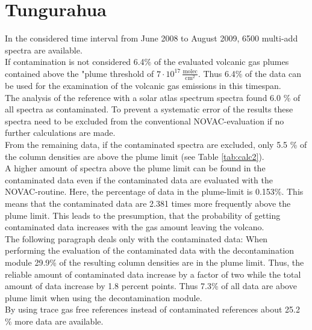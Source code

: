 \documentclass  [
  paper    = a4,
  BCOR     = 10mm,
  twoside,
  fontsize = 12pt,
  fleqn,
  toc      = bibnumbered,
  toc      = listofnumbered,
  numbers  = noendperiod,
  headings = normal,
  listof   = leveldown,
  version  = 3.03
]                                       {scrreprt}
\begin{document}
\section{Tungurahua}
In the considered time interval from June 2008 to August 2009, 6500 multi-add spectra are available. \\
If contamination is not considered
6.4\% of the evaluated volcanic gas plumes contained  above the "plume threshold of $7\cdot10^{17}\,\frac{\text{molec}}{\text{cm}^2}$. Thus 6.4\% of the data can be used for the examination of the volcanic gas emissions in this timespan.\\
The analysis of the reference with a solar atlas spectrum spectra found 6.0 \% of all spectra as contaminated. To prevent a systematic error of the results these spectra need to be excluded from the conventional NOVAC-evaluation if no further calculations are made.\\
From the remaining data,  if the contaminated spectra are excluded, only 5.5 \% of the   column densities are above the plume limit  (see  Table \ref{tab:calc2}). \\
A higher amount of spectra above the   plume limit can be found in the contaminated data even if the contaminated data are evaluated with the NOVAC-routine. Here, the percentage of data in the plume-limit is 0.153\%.
This means that the contaminated data are 2.381 times more frequently above the plume limit. This leads to the presumption, that the probability of getting contaminated data increases with the gas amount leaving the volcano.\\
The following paragraph deals only with the contaminated data:    
When performing the evaluation of the contaminated data with the decontamination module 29.9\% of the resulting   column densities are in the plume limit. Thus, the reliable amount of contaminated data increase by a factor of two while the total amount of data increase by 1.8 percent points. Thus 7.3\% of all data are above plume limit when using the decontamination module.\\
By using trace gas free references instead of contaminated references about 25.2 \% more data are available. \\

\end{document}
